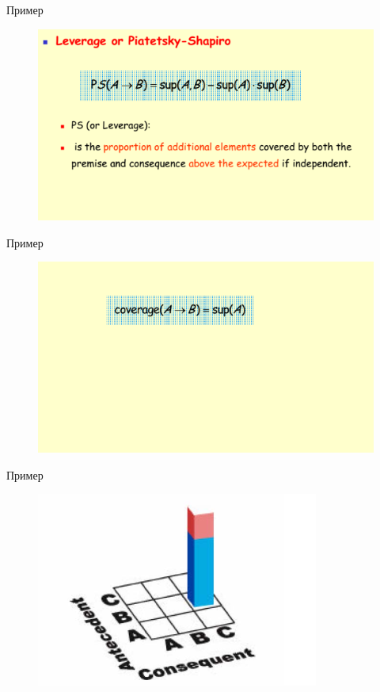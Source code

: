 \documentclass{beamer}
\begin{document}
\begin{frame}{Пример}
\begin{figure}[h]
\centering
\includegraphics[scale=0.6]{images/lec08-pic25.png}
\end{figure}
\end{frame}

\begin{frame}{Пример}
\begin{figure}[h]
\centering
\includegraphics[scale=0.6]{images/lec08-pic26.png}
\end{figure}
\end{frame}

\begin{frame}{Пример}
\begin{figure}[h]
\centering
\includegraphics[scale=0.6]{images/lec08-pic27.png}
\end{figure}
\end{frame}
\end{document}
